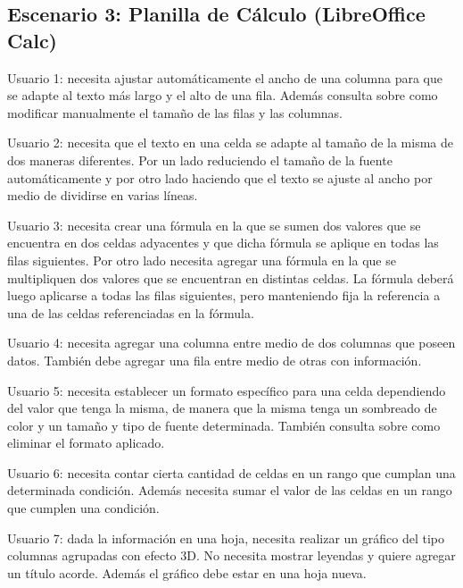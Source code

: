 \documentclass[12pt]{article}
\begin{document}
\subsection*{Escenario 3: Planilla de Cálculo (LibreOffice Calc)}

\begin{description}

    \item{Usuario 1}: necesita ajustar automáticamente el ancho de una columna
    para que se adapte al texto más largo y el alto de una fila. Además
    consulta sobre como modificar manualmente el tamaño de las filas y las
    columnas.

    \item{Usuario 2}: necesita que el texto en una celda se adapte al tamaño
    de la misma de dos maneras diferentes. Por un lado reduciendo el tamaño de
    la fuente automáticamente y por otro lado haciendo que el texto se ajuste
    al ancho por medio de dividirse en varias líneas.

    \item{Usuario 3}: necesita crear una fórmula en la que se sumen dos
    valores que se encuentra en dos celdas adyacentes y que dicha fórmula se
    aplique en todas las filas siguientes. Por otro lado necesita agregar una
    fórmula en la que se multipliquen dos valores que se encuentran en
    distintas celdas. La fórmula deberá luego aplicarse a todas las filas
    siguientes, pero manteniendo fija la referencia a una de las celdas
    referenciadas en la fórmula.

    \item{Usuario 4}: necesita agregar una columna entre medio de dos columnas
    que poseen datos. También debe agregar una fila entre medio de otras con
    información.

    \item{Usuario 5}: necesita establecer un formato específico para una celda
    dependiendo del valor que tenga la misma, de manera que la misma tenga un
    sombreado de color y un tamaño y tipo de fuente determinada. También
    consulta sobre como eliminar el formato aplicado.

    \item{Usuario 6}: necesita contar cierta cantidad de celdas en un rango
    que cumplan una determinada condición. Además necesita sumar el valor de
    las celdas en un rango que cumplen una condición.

    \item{Usuario 7}: dada la información en una hoja, necesita realizar un
    gráfico del tipo columnas agrupadas con efecto 3D. No necesita mostrar
    leyendas y quiere agregar un título acorde. Además el gráfico debe estar
    en una hoja nueva.


\end{description}
\end{document}

